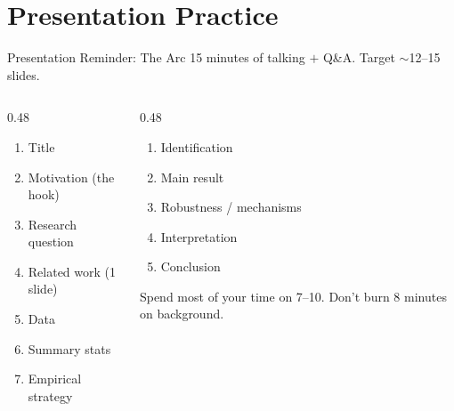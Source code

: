 \section{Presentation Practice}

\begin{frame}{Presentation Reminder: The Arc}
  \footnotesize
  15 minutes of talking $+$ Q\&A. Target $\sim$12--15 slides.

  \vspace{4pt}

  \begin{columns}[T]
    \begin{column}{0.48\textwidth}
      \begin{enumerate}\setlength\itemsep{0pt}
        \item Title
        \item Motivation (the hook)
        \item Research question
        \item Related work (1 slide)
        \item Data
        \item Summary stats
        \item Empirical strategy
      \end{enumerate}
    \end{column}
    \begin{column}{0.48\textwidth}
      \begin{enumerate}\setlength\itemsep{0pt}
        \setcounter{enumi}{7}
        \item Identification
        \item Main result
        \item Robustness / mechanisms
        \item Interpretation
        \item Conclusion
      \end{enumerate}

      \vspace{4pt}

      Spend most of your time on 7--10. Don't burn 8 minutes on background.
    \end{column}
  \end{columns}
\end{frame}

